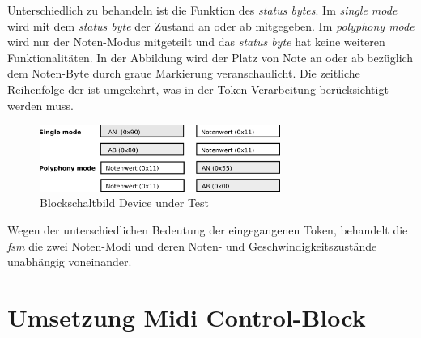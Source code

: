 Unterschiedlich zu behandeln ist die Funktion des \textit{status bytes}. Im \textit{single mode} wird mit dem \textit{status byte} der Zustand an oder ab mitgegeben. Im \textit{polyphony mode} wird nur der Noten-Modus mitgeteilt und das \textit{status byte} hat keine weiteren Funktionalitäten. In der Abbildung wird der Platz von Note an oder ab bezüglich dem Noten-Byte durch graue Markierung veranschaulicht. Die zeitliche Reihenfolge der ist umgekehrt, was in der Token-Verarbeitung berücksichtigt werden muss.\\

\begin{figure}[H]
	\centering
	\includegraphics[width=0.7\textwidth]{images/midi_interface/MIDI_Spezifikation_Datenfolge.png}
	\caption{Blockschaltbild Device under Test}
	\label{fig.testbench_polypphon_mode}
\end{figure}

Wegen der unterschiedlichen Bedeutung der eingegangenen Token, behandelt die \textit{fsm} die zwei Noten-Modi und deren Noten- und Geschwindigkeitszustände unabhängig voneinander.



\newpage
\section{Umsetzung Midi Control-Block}\label{sect.midi_umsetzung}

